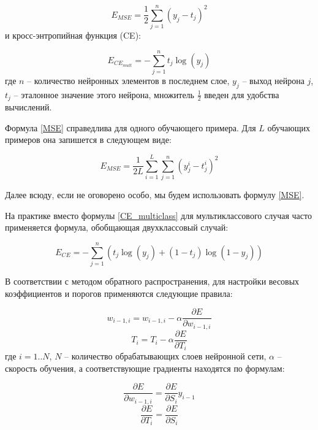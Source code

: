 \begin{equation}
	\label{MSE}
	E_{MSE} = \frac{1}{2}\sum_{j=1}^{n}(y_j - t_j)^2
\end{equation}
и кросс-энтропийная функция (CE):

\begin{equation}
	\label{CE_multiclass}
	E_{CE_{mult}} = -\sum_{j=1}^{n}t_j\log(y_j)
\end{equation}
где $n$ -- количество нейронных элементов в последнем слое, $y_j$ -- выход нейрона $j$, $t_j$ -- эталонное значение этого нейрона, множитель $\frac{1}{2}$ введен для удобства вычислений.

Формула \ref{MSE} справедлива для одного обучающего примера. Для $L$ обучающих примеров она запишется в следующем виде:

\begin{equation}
	\label{MSE_L}
	E_{MSE} = \frac{1}{2L}\sum_{i=1}^{L}\sum_{j=1}^{n}(y_j^i - t_j^i)^2	
\end{equation}

Далее всюду, если не оговорено особо, мы будем использовать формулу \ref{MSE}.

На практике вместо формулы \ref{CE_multiclass} для мультиклассового случая часто применяется формула, обобщающая двухклассовый случай:

\begin{equation}
	\label{CE}
	E_{CE} = -\sum_{j=1}^n(t_j\log(y_j) + (1-t_j)\log(1-y_j))
\end{equation}

В соответствии с методом обратного распространения, для настройки весовых коэффициентов и порогов применяются следующие правила:

\begin{equation}
	w_{i-1,i} = w_{i-1, i} - \alpha \frac{\partial E}{\partial w_{i-1, i}}
\end{equation}
\begin{equation}
	T_i = T_i - \alpha \frac{\partial E}{\partial T_i}
\end{equation}
где $i=1..N$, $N$ -- количество обрабатывающих слоев нейронной сети, $\alpha$ -- скорость обучения, а соответствующие градиенты находятся по формулам:

\begin{equation}
	\label{weights_delta}
	\frac{\partial E}{\partial w_{i-1, i}} = \frac{\partial E}{\partial S_i} y_{i-1}
\end{equation}
\begin{equation}
	\label{biases_delta}
	\frac{\partial E}{\partial T_i} = \frac{\partial E}{\partial S_i}
\end{equation}

